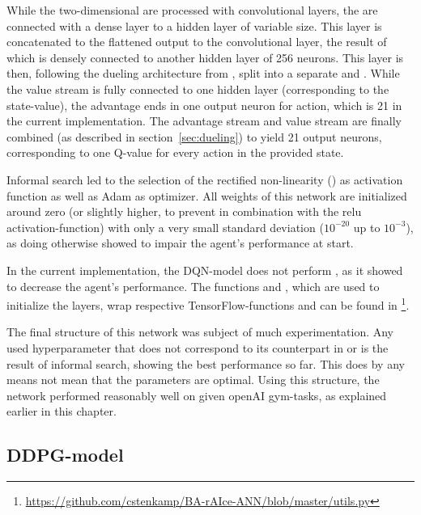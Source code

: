 While the two-dimensional  are processed with convolutional layers, the  are connected with a dense layer to a hidden layer of variable size. This layer is concatenated to the flattened output to the convolutional layer, the result of which is densely connected to another hidden layer of 256 neurons. This layer is then, following the dueling architecture from \cite{wang_dueling_2015}, split into a separate  and . While the value stream is fully connected to one hidden layer (corresponding to the state-value), the advantage ends in one output neuron for action, which is 21 in the current implementation. The advantage stream and value stream are finally combined (as described in section~\ref{sec:dueling}) to yield 21 output neurons, corresponding to one Q-value for every action in the provided state.

Informal search led to the selection of the rectified non-linearity () as activation function as well as Adam\cite{kingma_adam:_2014} as optimizer. All weights of this network are initialized around zero (or slightly higher, to prevent  in combination with the relu activation-function) with only a very small standard deviation ($10^{-20}$ up to $10^{-3}$), as doing otherwise showed to impair the agent's performance at start.

In the current implementation, the DQN-model does not perform \cite{ioffe_batch_2015}, as it showed to decrease the agent's performance. The functions  and , which are used to initialize the layers, wrap respective TensorFlow-functions and can be found in \footnote{\url{https://github.com/cstenkamp/BA-rAIce-ANN/blob/master/utils.py}}.

The final structure of this network was subject of much experimentation. Any used hyperparameter that does not correspond to its counterpart in \cite{mnih_human-level_2015} or \cite{wang_dueling_2015} is the result of informal search, showing the best performance so far. This does by any means not mean that the parameters are optimal. Using this structure, the network performed reasonably well on given openAI gym-tasks, as explained earlier in this chapter.


\subsection{DDPG-model}

